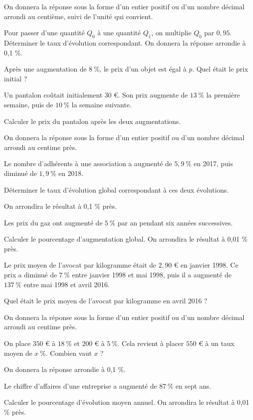 On donnera la réponse sous la forme d'un entier positif ou d'un nombre décimal arrondi au centième, suivi de l'unité qui convient.

\exo
Pour passer d'une quantité $Q_0$ à une quantité $Q_1$, on multiplie $Q_0$ par $0,95$.
Déterminer le taux d'évolution correspondant.
On donnera la réponse arrondie à 0,1 \%.


\exo
Après une augmentation de $8~\%$, le prix d'un objet est égal à $p$.
Quel était le prix initial ?


\exo
Un pantalon coûtait initialement $30$ \euro{}. Son prix augmente de $13~\%$ la première semaine, puis de $10~\%$ la semaine suivante.

Calculer le prix du pantalon après les deux augmentations.

On donnera la réponse sous la forme d'un entier positif ou d'un nombre décimal arrondi au centime près.

\exo
Le nombre d'adhérents à une association a augmenté de $5,9~\%$ en 2017, puis diminué de $1,9~\%$ en 2018.

Déterminer le taux d'évolution global correspondant à ces deux évolutions.

On arrondira le résultat à 0,1 \% près.

\exo
Les prix du gaz ont augmenté de $5~\%$ par an pendant six années successives.

Calculer le pourcentage d'augmentation global.
On arrondira le résultat à 0,01 \% près.

\exo
Le prix moyen de l'avocat par kilogramme était de $2,90$ \euro{} en janvier 1998.
Ce prix a diminué de $7~\%$ entre janvier 1998 et mai 1998, puis il a augmenté de $137~\%$ entre mai 1998 et avril 2016.

Quel était le prix moyen de l'avocat par kilogramme en avril 2016 ?

On donnera la réponse sous la forme d'un entier positif ou d'un nombre décimal arrondi au centime près.


\exo
On place $350$ \euro{} à $18~\%$ et $200$ \euro{} à $5~\%$.
Cela revient à placer $550$ \euro{} à un taux moyen de $x~\%$.
Combien vaut $x$ ?

On donnera la réponse arrondie à 0,1 \%.

\exo
Le chiffre d'affaires d'une entreprise a augmenté de $87~\%$ en sept ans.

Calculer le pourcentage d'évolution moyen annuel.
On arrondira le résultat à 0,01 \% près.
